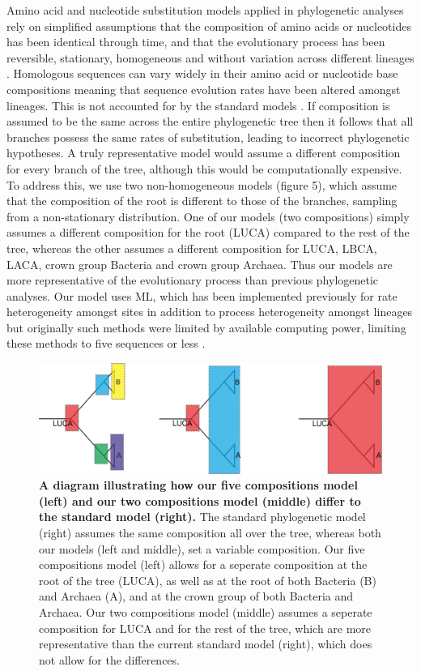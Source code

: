 Amino acid and nucleotide substitution models applied in phylogenetic analyses rely on simplified assumptions that the composition of amino acids or nucleotides has been identical through time, and that the evolutionary process has been reversible, stationary, homogeneous \cite{groussin2013branch} and without variation across different lineages \cite{groussin2013branch,jayaswal2011reducing}. Homologous sequences can vary widely in their amino acid or nucleotide base compositions \cite{zeldovich2007,dutheil2008non} meaning that sequence evolution rates have been altered amongst lineages. This is not accounted for by the standard models \cite{galtier1997relationships}. If composition is assumed to be the same across the entire phylogenetic tree then it follows that all branches possess the same rates of substitution, leading to incorrect phylogenetic hypotheses. A truly representative model would assume a different composition for every branch of the tree, although this would be computationally expensive. To address this, we use two non-homogeneous models (figure 5),  which assume that the composition of the root is different to those of the branches, sampling from a non-stationary distribution. One of our models (two compositions) simply assumes a different composition for the root (LUCA) compared to the rest of the tree, whereas the other assumes a different composition for LUCA, LBCA, LACA, crown group Bacteria and crown group Archaea. Thus our models are more representative of the evolutionary process than previous phylogenetic analyses. Our model uses ML, which has been implemented previously \cite{yang2000phylogenetic} for rate heterogeneity amongst sites in addition to process heterogeneity amongst lineages but originally such methods were limited by available computing power, limiting these methods to five sequences or less \cite{galtier1998inferring}.

\begin{figure}
\includegraphics[width=\textwidth]{figures/modelcomparison3.png}
\centering
\caption{\textbf{A diagram illustrating how our five compositions model (left) and our two compositions model (middle) differ to the standard model (right).} The standard phylogenetic model (right) assumes the same composition all over the tree, whereas both our models (left and middle), set a variable composition. Our five compositions model (left) allows for a seperate composition at the root of the tree (LUCA), as well as at the root of both Bacteria (B) and Archaea (A), and at the crown group of both Bacteria and Archaea. Our two compositions model (middle) assumes a seperate composition for LUCA and for the rest of the tree, which are more representative than the current standard model (right), which does not allow for the differences.}
\end{figure}

